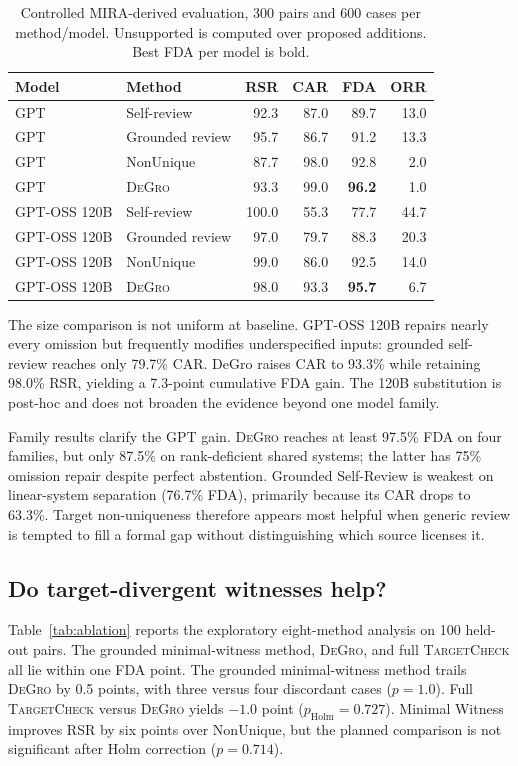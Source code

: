 \documentclass[sigconf,anonymous]{aamas}
\newcommand{\method}{\textsc{DeGro}}
\newcommand{\tc}{\textsc{TargetCheck}}
\begin{document}
\begin{table}[t]
\centering
\caption{Controlled MIRA-derived evaluation, 300 pairs and 600 cases per method/model. Unsupported is computed over proposed additions. Best FDA per model is bold.}
\label{tab:main}
\small
\begin{tabular}{llrrrr}
\toprule
Model & Method & RSR & CAR & FDA & ORR\\
\midrule
GPT & Self-review & 92.3 & 87.0 & 89.7 & 13.0\\
GPT & Grounded review & 95.7 & 86.7 & 91.2 & 13.3\\
GPT & NonUnique & 87.7 & 98.0 & 92.8 & 2.0\\
GPT & \method & 93.3 & 99.0 & \textbf{96.2} & 1.0\\
\midrule
GPT-OSS 120B & Self-review & 100.0 & 55.3 & 77.7 & 44.7\\
GPT-OSS 120B & Grounded review & 97.0 & 79.7 & 88.3 & 20.3\\
GPT-OSS 120B & NonUnique & 99.0 & 86.0 & 92.5 & 14.0\\
GPT-OSS 120B & \method & 98.0 & 93.3 & \textbf{95.7} & 6.7\\
\bottomrule
\end{tabular}
\end{table}

The size comparison is not uniform at baseline.  GPT-OSS 120B repairs nearly every omission but frequently modifies underspecified inputs: grounded self-review reaches only 79.7\% CAR.  DeGro raises CAR to 93.3\% while retaining 98.0\% RSR, yielding a 7.3-point cumulative FDA gain.  The 120B substitution is post-hoc and does not broaden the evidence beyond one model family.

Family results clarify the GPT gain.  \method{} reaches at least 97.5\% FDA on four families, but only 87.5\% on rank-deficient shared systems; the latter has 75\% omission repair despite perfect abstention.  Grounded Self-Review is weakest on linear-system separation (76.7\% FDA), primarily because its CAR drops to 63.3\%.  Target non-uniqueness therefore appears most helpful when generic review is tempted to fill a formal gap without distinguishing which source licenses it.

\subsection{Do target-divergent witnesses help?}
Table~\ref{tab:ablation} reports the exploratory eight-method analysis on 100 held-out pairs.  The grounded minimal-witness method, \method{}, and full \tc{} all lie within one FDA point.  The grounded minimal-witness method trails \method{} by 0.5 points, with three versus four discordant cases ($p=1.0$).  Full \tc{} versus \method{} yields $-1.0$ point ($p_{\mathrm{Holm}}=0.727$).  Minimal Witness improves RSR by six points over NonUnique, but the planned comparison is not significant after Holm correction ($p=0.714$).
\end{document}
